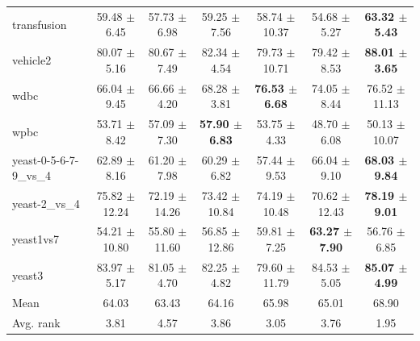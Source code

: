 \begin{table}[t]
\begin{tabular}{lcccccc}
transfusion & 59.48 $\pm$ 6.45 & 57.73 $\pm$ 6.98 & 59.25 $\pm$ 7.56 & 58.74 $\pm$ 10.37 & 54.68 $\pm$ 5.27 & \textbf{63.32 $\pm$ 5.43} \\
vehicle2 & 80.07 $\pm$ 5.16 & 80.67 $\pm$ 7.49 & 82.34 $\pm$ 4.54 & 79.73 $\pm$ 10.71 & 79.42 $\pm$ 8.53 & \textbf{88.01 $\pm$ 3.65} \\
wdbc & 66.04 $\pm$ 9.45 & 66.66 $\pm$ 4.20 & 68.28 $\pm$ 3.81 & \textbf{76.53 $\pm$ 6.68} & 74.05 $\pm$ 8.44 & 76.52 $\pm$ 11.13 \\
wpbc & 53.71 $\pm$ 8.42 & 57.09 $\pm$ 7.30 & \textbf{57.90 $\pm$ 6.83} & 53.75 $\pm$ 4.33 & 48.70 $\pm$ 6.08 & 50.13 $\pm$ 10.07 \\
yeast-0-5-6-7-9\_vs\_4 & 62.89 $\pm$ 8.16 & 61.20 $\pm$ 7.98 & 60.29 $\pm$ 6.82 & 57.44 $\pm$ 9.53 & 66.04 $\pm$ 9.10 & \textbf{68.03 $\pm$ 9.84} \\
yeast-2\_vs\_4 & 75.82 $\pm$ 12.24 & 72.19 $\pm$ 14.26 & 73.42 $\pm$ 10.84 & 74.19 $\pm$ 10.48 & 70.62 $\pm$ 12.43 & \textbf{78.19 $\pm$ 9.01} \\
yeast1vs7 & 54.21 $\pm$ 10.80 & 55.80 $\pm$ 11.60 & 56.85 $\pm$ 12.86 & 59.81 $\pm$ 7.25 & \textbf{63.27 $\pm$ 7.90} & 56.76 $\pm$ 6.85 \\
yeast3 & 83.97 $\pm$ 5.17 & 81.05 $\pm$ 4.70 & 82.25 $\pm$ 4.82 & 79.60 $\pm$ 11.79 & 84.53 $\pm$ 5.05 & \textbf{85.07 $\pm$ 4.99} \\
\midrule
Mean & 64.03 & 63.43 & 64.16 & 65.98 & 65.01 & 68.90 \\
Avg. rank & 3.81 & 4.57 & 3.86 & 3.05 & 3.76 & 1.95 \\
\bottomrule
\end{tabular}
\end{table}